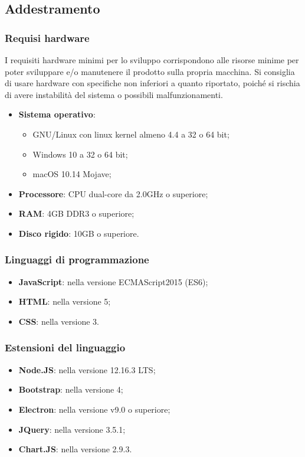 \documentclass[../manuale-sviluppatore.tex]{subfiles}
\begin{document}
\subsection{Addestramento}%
\label{subs:addestramento}

\subsubsection{Requisi hardware}
I requisiti hardware minimi per lo sviluppo corrispondono alle risorse minime per poter sviluppare e/o manutenere il prodotto sulla propria macchina. Si consiglia di usare hardware con specifiche non inferiori a quanto riportato, poiché si rischia di avere instabilità del sistema o possibili malfunzionamenti.
\begin{itemize}
  \item \textbf{Sistema operativo}:
  \begin{itemize}
    \item GNU/Linux con linux kernel almeno 4.4 a 32 o 64 bit;
    \item Windows 10 a 32 o 64 bit;
    \item macOS 10.14 Mojave;
  \end{itemize}
  \item \textbf{Processore}: CPU dual-core da 2.0GHz o superiore;
  \item \textbf{RAM}: 4GB DDR3 o superiore;
  \item \textbf{Disco rigido}: 10GB o superiore.
\end{itemize}

\subsubsection{Linguaggi di programmazione}
\begin{itemize}
  \item \textbf{JavaScript}: nella versione ECMAScript2015 (ES6);
  \item \textbf{HTML}: nella versione 5;
  \item \textbf{CSS}: nella versione 3.
\end{itemize}

\subsubsection{Estensioni del linguaggio}
\begin{itemize}
  \item \textbf{Node.JS}: nella versione 12.16.3 LTS;
  \item \textbf{Bootstrap}: nella versione 4;
  \item \textbf{Electron}: nella versione v9.0 o superiore;
  \item \textbf{JQuery}: nella versione 3.5.1;
  \item \textbf{Chart.JS}: nella versione 2.9.3.
\end{itemize}
\end{document}
